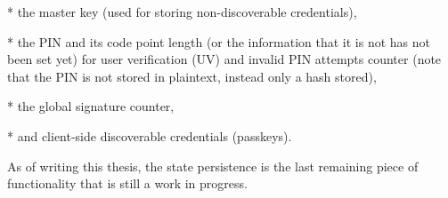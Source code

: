 \begitems

* the master key (used for storing non-discoverable credentials),

* the PIN and its code point length (or the information that it is not has not been set yet) for user verification (UV) and invalid PIN attempts counter (note that the PIN is not stored in plaintext, instead only a hash stored),

* the global signature counter,

* and client-side discoverable credentials (passkeys).

\enditems

As of writing this thesis, the state persistence is the last remaining piece of functionality that is still a work in progress.
